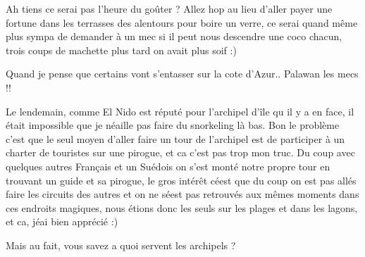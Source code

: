 \begin{multicols}{2}
Ah tiens ce serai pas l'heure du goûter ? Allez hop au lieu d'aller payer une fortune dans les terrasses des alentours pour boire un verre, ce serai quand même plus sympa de demander à un mec si il peut nous descendre une coco chacun, trois coups de machette plus tard on avait plus soif :)


Quand je pense que certains vont s'entasser sur la cote d'Azur.. Palawan les mecs !!


Le lendemain, comme El Nido est réputé pour l'archipel d'île qu il y a en face, il était impossible que je néaille pas faire du snorkeling là bas. Bon le problème c'est que le seul moyen d'aller faire un tour de l'archipel est de participer à un charter de touristes sur une pirogue, et ca c'est pas trop mon truc. Du coup avec quelques autres Français et un Suédois on s'est monté notre propre tour en trouvant un guide et sa pirogue, le gros intérêt céest que du coup on est pas allés faire les circuits des autres et on ne séest pas retrouvés aux mêmes moments dans ces endroits magiques, nous étions donc les seuls sur les plages et dans les lagons, et ca, jéai bien apprécié :)


Mais au fait, vous savez a quoi servent les archipels ?

\end{multicols}
